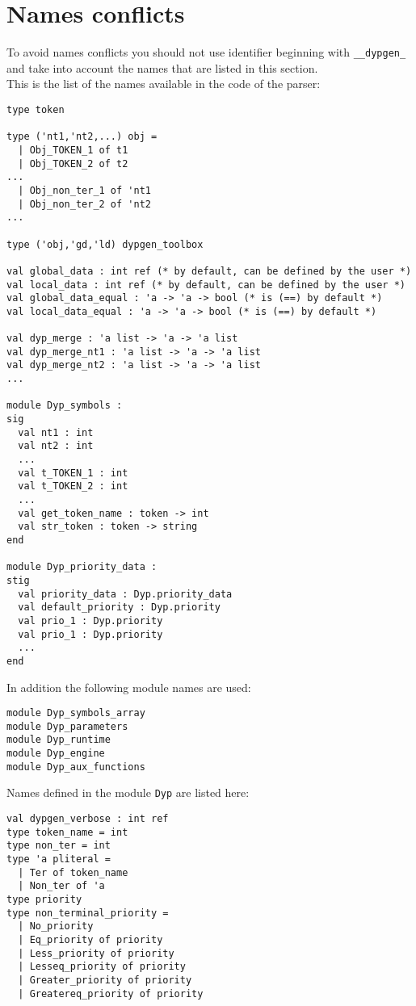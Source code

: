 \documentclass[12pt]{article}
\begin{document}
{\section{Names conflicts}

To avoid names conflicts you should not use identifier beginning with \verb|__dypgen_| and take into account the names that are listed in this section.\\

This is the list of the names available in the code of the parser:
\begin{verbatim}
type token

type ('nt1,'nt2,...) obj =
  | Obj_TOKEN_1 of t1
  | Obj_TOKEN_2 of t2
...
  | Obj_non_ter_1 of 'nt1
  | Obj_non_ter_2 of 'nt2
...

type ('obj,'gd,'ld) dypgen_toolbox

val global_data : int ref (* by default, can be defined by the user *)
val local_data : int ref (* by default, can be defined by the user *)
val global_data_equal : 'a -> 'a -> bool (* is (==) by default *)
val local_data_equal : 'a -> 'a -> bool (* is (==) by default *)

val dyp_merge : 'a list -> 'a -> 'a list
val dyp_merge_nt1 : 'a list -> 'a -> 'a list
val dyp_merge_nt2 : 'a list -> 'a -> 'a list
...

module Dyp_symbols :
sig
  val nt1 : int
  val nt2 : int
  ...
  val t_TOKEN_1 : int
  val t_TOKEN_2 : int
  ...
  val get_token_name : token -> int
  val str_token : token -> string
end

module Dyp_priority_data :
stig
  val priority_data : Dyp.priority_data
  val default_priority : Dyp.priority
  val prio_1 : Dyp.priority
  val prio_1 : Dyp.priority
  ...
end
\end{verbatim}

In addition the following module names are used:
\begin{verbatim}
module Dyp_symbols_array
module Dyp_parameters
module Dyp_runtime
module Dyp_engine
module Dyp_aux_functions
\end{verbatim}

Names defined in the module \verb|Dyp| are listed here:
\begin{verbatim}
val dypgen_verbose : int ref
type token_name = int
type non_ter = int
type 'a pliteral =
  | Ter of token_name
  | Non_ter of 'a
type priority
type non_terminal_priority =
  | No_priority
  | Eq_priority of priority
  | Less_priority of priority
  | Lesseq_priority of priority
  | Greater_priority of priority
  | Greatereq_priority of priority


\end{verbatim}}
\end{document}
